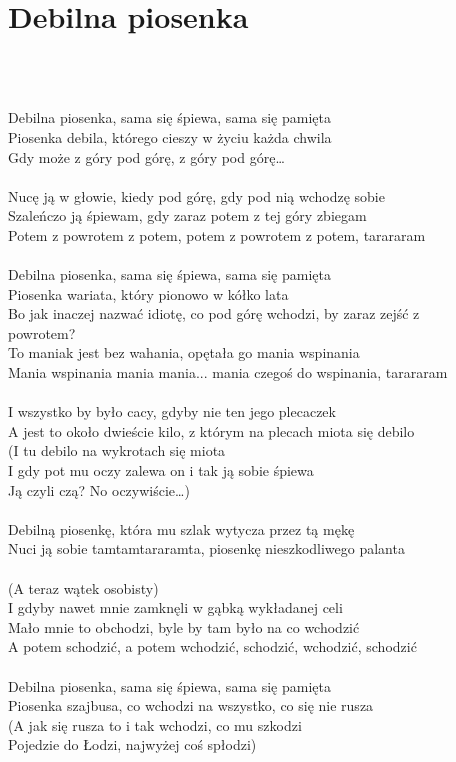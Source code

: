 \documentclass[a5paper, 10pt]{book}
\begin{document}
\newpage
\section{Debilna piosenka}\textcolor{lightgray}{\textit{}}\\~\\
\begin{minipage}[t]{0.85\textwidth}
  Debilna piosenka, sama się śpiewa, sama się pamięta\\
  Piosenka debila, którego cieszy w życiu każda chwila\\
  Gdy może z góry pod górę, z góry pod górę…\\
  \\
  Nucę ją w głowie, kiedy pod górę, gdy pod nią wchodzę sobie\\
  Szaleńczo ją śpiewam, gdy zaraz potem z tej góry zbiegam\\
  Potem z powrotem z potem, potem z powrotem z potem, tarararam\\
  \\
  Debilna piosenka, sama się śpiewa, sama się pamięta\\
  Piosenka wariata, który pionowo w kółko lata\\
  Bo jak inaczej nazwać idiotę, co pod górę wchodzi, by zaraz zejść z\\
  powrotem?\\
  To maniak jest bez wahania, opętała go mania wspinania\\
  Mania wspinania mania mania... mania czegoś do wspinania, tarararam\\
  \\
  I wszystko by było cacy, gdyby nie ten jego plecaczek\\
  A jest to około dwieście kilo, z którym na plecach miota się debilo\\
  (I tu debilo na wykrotach się miota\\
  I gdy pot mu oczy zalewa on i tak ją sobie śpiewa\\
  Ją czyli czą? No oczywiście…)\\
  \\
  Debilną piosenkę, która mu szlak wytycza przez tą mękę\\
  Nuci ją sobie tamtamtararamta, piosenkę nieszkodliwego palanta\\
  \\
  (A teraz wątek osobisty)\\
  I gdyby nawet mnie zamknęli w gąbką wykładanej celi\\
  Mało mnie to obchodzi, byle by tam było na co wchodzić\\
  A potem schodzić, a potem wchodzić, schodzić, wchodzić, schodzić\\
  \\
  Debilna piosenka, sama się śpiewa, sama się pamięta\\
  Piosenka szajbusa, co wchodzi na wszystko, co się nie rusza\\
  (A jak się rusza to i tak wchodzi, co mu szkodzi\\
  Pojedzie do Łodzi, najwyżej coś spłodzi)\\


\end{minipage}
\end{document}
